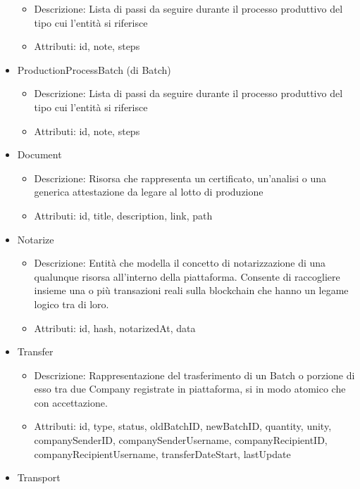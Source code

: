 \documentclass[a4paper,11pt]{article}
\begin{document}
\begin{itemize}
        \begin{itemize}
          \item Descrizione: Lista di passi da seguire durante il processo produttivo del tipo cui l'entità si riferisce
          \item Attributi: id, note, steps
        \end{itemize}
  \item ProductionProcessBatch (di Batch)
        \begin{itemize}
          \item Descrizione: Lista di passi da seguire durante il processo produttivo del tipo cui l'entità si riferisce
          \item Attributi: id, note, steps
        \end{itemize}
  \item Document
        \begin{itemize}
          \item Descrizione: Risorsa che rappresenta un certificato, un'analisi o una generica attestazione da legare al lotto di produzione
          \item Attributi: id, title, description, link, path
        \end{itemize}
  \item Notarize
        \begin{itemize}
          \item Descrizione: Entità che modella il concetto di notarizzazione di una qualunque risorsa all'interno della piattaforma. Consente di raccogliere insieme una o più transazioni reali sulla blockchain che hanno un legame logico tra di loro.
          \item Attributi: id, hash, notarizedAt, data
        \end{itemize}
  \item Transfer
        \begin{itemize}
          \item Descrizione: Rappresentazione del trasferimento di un Batch o porzione di esso tra due Company registrate in piattaforma, si in modo atomico che con accettazione.
          \item Attributi: id, type, status, oldBatchID, newBatchID, quantity, unity, companySenderID, companySenderUsername, companyRecipientID, companyRecipientUsername, transferDateStart, lastUpdate
        \end{itemize}
  \item Transport
        \begin{itemize}

\end{itemize}
\end{itemize}
\end{document}

